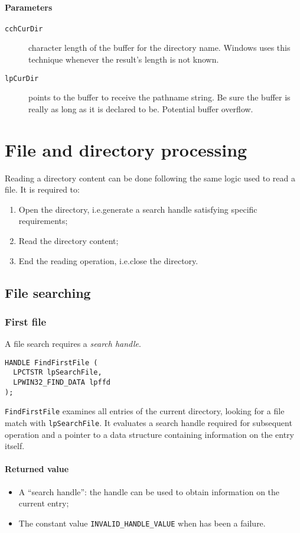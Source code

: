 \paragraph{Parameters}
\begin{description}
\item [\texttt{cchCurDir}] character length of the buffer for the directory name. Windows uses this technique whenever the result's length is not known.
\item [\texttt{lpCurDir}] points to the buffer to receive the pathname string. Be sure the buffer is really as long as it is declared to be. Potential buffer overflow.
\end{description}

\section{File and directory processing}
Reading a directory content can be done following the same logic used to read a file. It is required to:
\begin{enumerate}
\item Open the directory, i.e.\@ generate a search handle satisfying specific requirements;
\item Read the directory content;
\item End the reading operation, i.e.\@ close the directory.
\end{enumerate}

\subsection{File searching}
\subsubsection{First file}
A file search requires a \emph{search handle}.
\begin{verbatim}
HANDLE FindFirstFile (
  LPCTSTR lpSearchFile,
  LPWIN32_FIND_DATA lpffd
);
\end{verbatim}
\texttt{FindFirstFile} examines all entries of the current directory, looking for a file match with \texttt{lpSearchFile}. It evaluates a search handle required for subsequent operation and a pointer to a data structure containing information on the entry itself.

\paragraph{Returned value}
\begin{itemize}
\item A ``search handle'': the handle can be used to obtain information on the current entry;
\item The constant value \texttt{INVALID\_HANDLE\_VALUE} when has been a failure.
\end{itemize}

